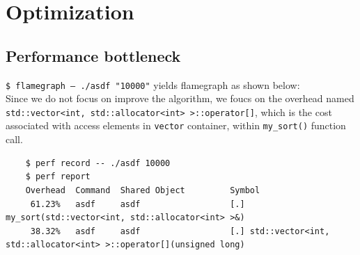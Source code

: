 \documentclass[a4paper]{article}
\begin{document}
\section{Optimization}
\par\vspace{-0.5em}
\subsection*{Performance bottleneck}
\texttt{\$ flamegraph -- ./asdf "10000"} yields flamegraph as shown below:\\
\noindent{}
Since we do not focus on improve the algorithm, we foucs on the overhead named 
\texttt{std::vector<int, std::allocator<int> >::operator[]},
 which is the cost associated with access elements in \texttt{vector} container, within \texttt{my\_sort()} function call.
\begin{lstlisting}
    $ perf record -- ./asdf 10000
    $ perf report
    Overhead  Command  Shared Object         Symbol
     61.23%   asdf     asdf                  [.] my_sort(std::vector<int, std::allocator<int> >&)
     38.32%   asdf     asdf                  [.] std::vector<int, std::allocator<int> >::operator[](unsigned long)
\end{lstlisting}
\end{document}
